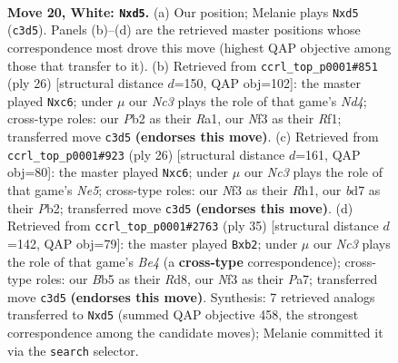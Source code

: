 \documentclass[11pt]{article}
\begin{document}
\clearpage

\begin{figure}[p]\centering
\begin{subfigure}{0.46\textwidth}\centering
\resizebox{\linewidth}{!}{%
\newchessgame
\chessboard[
  setfen={rn1qk1r1/3bbp2/1p1p4/pBpn4/P3P2B/2N2N1P/RP1Q2P1/4K2R w Kq - 2 20},
  showmover=false,
  pgfstyle=straightmove, color=movearrow, markmove={c3-d5}
]}
\caption{}
\end{subfigure}\hfill
\begin{subfigure}{0.46\textwidth}\centering
\resizebox{\linewidth}{!}{%
\newchessgame
\chessboard[
  setfen={r1bqr1k1/pp3pb1/2n2npp/1B1p2B1/3NP3/2N2P2/PP4PP/R2Q1R1K w - - 0 14},
  showmover=false,
  pgfstyle=straightmove, color=movearrow, markmove={d4-c6}
]}
\caption{}
\end{subfigure}
\\[4pt]
\begin{subfigure}{0.46\textwidth}\centering
\resizebox{\linewidth}{!}{%
\newchessgame
\chessboard[
  setfen={2rqk2r/pp3ppp/1nnbp1b1/1B2N3/3P2P1/2N2Q1P/PP3P2/R1B1K2R w KQk - 2 14},
  showmover=false,
  pgfstyle=straightmove, color=movearrow, markmove={e5-c6}
]}
\caption{}
\end{subfigure}\hfill
\begin{subfigure}{0.46\textwidth}\centering
\resizebox{\linewidth}{!}{%
\newchessgame
\chessboard[
  setfen={3r2k1/pp2rppp/1qnN1n2/4b3/2B3b1/P3PN2/1B2QPPP/1R1R2K1 b - - 5 18},
  showmover=false,
  pgfstyle=straightmove, color=movearrow, markmove={e5-b2}
]}
\caption{}
\end{subfigure}
\caption{\textbf{Move 20, White: \texttt{Nxd5}.} (a) Our position; Melanie plays \texttt{Nxd5} (\texttt{c3d5}). Panels (b)--(d) are the retrieved master positions whose correspondence most drove this move (highest QAP objective among those that transfer to it). (b) Retrieved from \texttt{ccrl\_top\_p0001\#851} (ply 26) [structural distance $d$=150, QAP obj=102]: the master played \texttt{Nxc6}; under $\mu$ our \emph{Nc3} plays the role of that game's \emph{Nd4}; cross-type roles: our \emph{P}b2 as their \emph{R}a1, our \emph{N}f3 as their \emph{R}f1; transferred move \texttt{c3d5} \textbf{(endorses this move)}. (c) Retrieved from \texttt{ccrl\_top\_p0001\#923} (ply 26) [structural distance $d$=161, QAP obj=80]: the master played \texttt{Nxc6}; under $\mu$ our \emph{Nc3} plays the role of that game's \emph{Ne5}; cross-type roles: our \emph{N}f3 as their \emph{R}h1, our \emph{b}d7 as their \emph{P}b2; transferred move \texttt{c3d5} \textbf{(endorses this move)}. (d) Retrieved from \texttt{ccrl\_top\_p0001\#2763} (ply 35) [structural distance $d$=142, QAP obj=79]: the master played \texttt{Bxb2}; under $\mu$ our \emph{Nc3} plays the role of that game's \emph{Be4} (a \textbf{cross-type} correspondence); cross-type roles: our \emph{B}b5 as their \emph{R}d8, our \emph{N}f3 as their \emph{P}a7; transferred move \texttt{c3d5} \textbf{(endorses this move)}. Synthesis: 7 retrieved analogs transferred to \texttt{Nxd5} (summed QAP objective 458, the strongest correspondence among the candidate moves); Melanie committed it via the \texttt{search} selector.}
\label{fig:thought-m38}
\end{figure}
\end{document}
